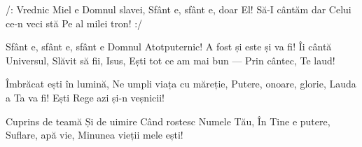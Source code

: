 \beginchorus
/: Vrednic Miel e
Domnul slavei,
Sfânt e, sfânt e, doar El!
Să-I cântăm dar
Celui ce-n veci stă
Pe al milei tron! :/
\endchorus

\beginverse
Sfânt e, sfânt e, sfânt e
Domnul Atotputernic!
A fost și este și va fi!
Îi cântă Universul,
Slăvit să fii, Isus,
Ești tot ce am mai bun —
Prin cântec, Te laud!
\endverse

\beginverse
Îmbrăcat ești în lumină,
Ne umpli viața cu măreție,
Putere, onoare, glorie,
Lauda a Ta va fi!
Ești Rege azi și-n veșnicii!
\endverse

\beginverse
Cuprins de teamă
Și de uimire
Când rostesc Numele Tău,
În Tine e putere,
Suflare, apă vie,
Minunea vieții mele ești!
\endverse
\endsong